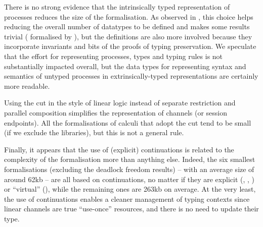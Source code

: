 There is no strong evidence that the intrinsically typed representation of
processes reduces the size of the formalisation. As observed in
, this choice helps reducing the overall number of
datatypes to be defined and makes some results trivial (\eg
{} formalised by ), but the
definitions are also more involved because they incorporate invariants and bits
of the proofs of typing preservation. We speculate that the effort for
representing processes, types and typing rules is not substantially impacted
overall, but the data types for representing syntax and semantics of untyped
processes in extrinsically-typed representations are certainly more readable.

Using the cut in the style of linear logic instead of separate restriction and
parallel composition simplifies the representation of channels (or session
endpoints). All the formalisations of calculi that adopt the cut tend to be
small (if we exclude the libraries), but this is not a general rule.

Finally, it appears that the use of (explicit) continuations is related to the
complexity of the formalisation more than anything else. Indeed, the six
smallest formalisations (excluding the deadlock freedom results) -- with an
average size of around 62kb -- are all based on continuations, no matter if they
are explicit (\LinearPI, \SCP, \LCC) or ``virtual'' (\GV), while the remaining
ones are 263kb on average. At the very least, the use of continuations enables a
cleaner management of typing contexts since linear channels are true
``use-once'' resources, and there is no need to update their type.

